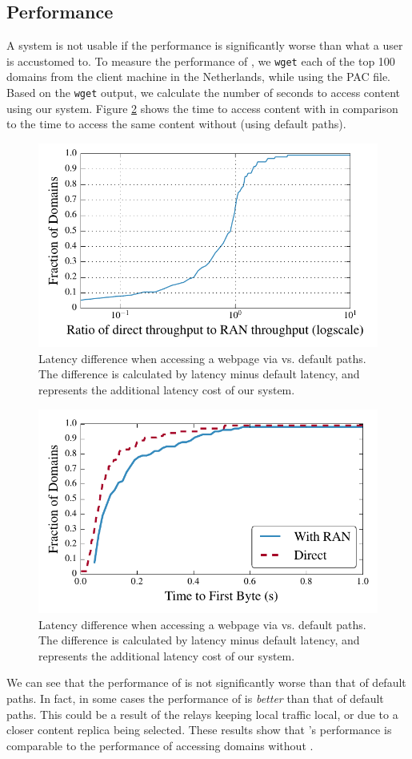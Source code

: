 \subsection{Performance}
A system is not usable if the performance is significantly worse than what a user
is accustomed to.  To measure the performance of \system{}, we {\tt wget} each 
of the top 100 domains from the client machine in the Netherlands, while 
using the PAC file.  Based on the {\tt wget} output, we calculate the number 
of seconds to access content using our system. Figure \ref{fig:latency} shows 
the time to access content with \system{} in comparison to the time to access the 
same content without \system{} (using default paths).  

\begin{figure}[t]
\centering
\includegraphics[width=.5\textwidth]{throughput}
\caption{Latency difference when accessing a webpage via \system{} vs. default paths. 
The difference is calculated by \system{} latency minus default latency, and represents 
the additional latency cost of our system.}
\label{fig:latency}
\end{figure}

\begin{figure}[t]
\centering
\includegraphics[width=.5\textwidth]{latency}
\caption{Latency difference when accessing a webpage via \system{} vs. default paths. 
The difference is calculated by \system{} latency minus default latency, and represents 
the additional latency cost of our system.}
\label{fig:latency}
\end{figure}

We can see that the performance of \system{} is not significantly worse than that 
of default paths.  In fact, in some cases the performance of \system{} is {\it 
better} than that of default paths.  This could be a result of the relays 
keeping local traffic local, or due to a closer content replica being selected. 
These results show that \system{}'s performance is comparable to the performance 
of accessing domains without \system{}.

